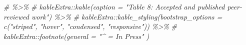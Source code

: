 \documentclass[
]{article}
\newenvironment{Shaded}{\begin{snugshade}}{\end{snugshade}}
\newcommand{\CommentTok}[1]{\textcolor[rgb]{0.56,0.35,0.01}{\textit{#1}}}
\begin{document}
\begin{Shaded}
\begin{Highlighting}[]
\CommentTok{\# \%\textgreater{}\%}
\CommentTok{\#     kableExtra::kable(caption = "Table 8: Accepted and published peer{-}reviewed work") \%\textgreater{}\%}
\CommentTok{\#   kableExtra::kable\_styling(bootstrap\_options = c("striped", "hover", "condensed", "responsive")) \%\textgreater{}\%}
\CommentTok{\#   kableExtra::footnote(general = "\^{} = In Press" )}
\end{Highlighting}
\end{Shaded}
\end{document}
